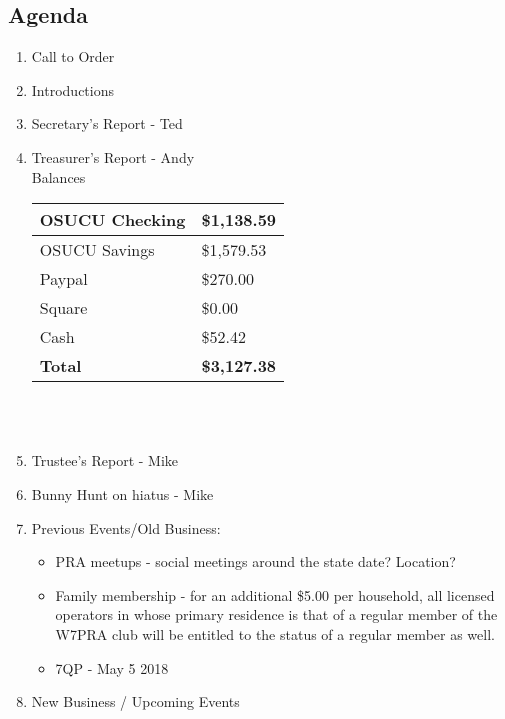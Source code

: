 \documentclass[letter,11pt]{extarticle}
\begin{document}
	\subsection*{Agenda}
	\begin{enumerate}
		\item Call to Order
		\item Introductions
		\item Secretary's Report - Ted
		\item Treasurer's Report - Andy \\
				Balances 
			\begin{tabular}{|l|l|} \hline
				OSUCU Checking & \$1,138.59 \\ \hline
				OSUCU Savings & \$1,579.53 \\ \hline
				Paypal & \$270.00 \\ \hline
				Square & \$0.00 \\ \hline
				Cash & \$52.42 \\ \hline
				\textbf{Total} & \textbf{\$3,127.38} \\ \hline
			\end{tabular} \\ \\
		\item Trustee's Report - Mike
		\item Bunny Hunt on hiatus - Mike
		\item Previous Events/Old Business:
			\begin{itemize}
				\item PRA meetups - social meetings around the state date? Location?
				\item Family membership - for an additional \$5.00 per household, all licensed operators in whose primary residence is that of a regular member of the W7PRA club will be entitled to the status of a regular member as well.
				\item 7QP - May 5 2018
			\end{itemize}
		\item  New Business / Upcoming Events

\end{enumerate}
\end{document}
